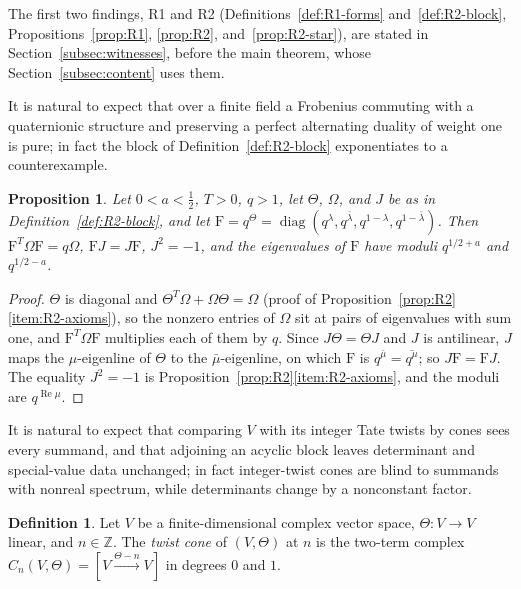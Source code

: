 \documentclass[11pt]{amsart}
\theoremstyle{plain}
\newtheorem{proposition}[theorem]{Proposition}
\theoremstyle{definition}
\newtheorem{definition}[theorem]{Definition}
\theoremstyle{remark}
\numberwithin{equation}{section}
\newcommand{\Z}{\mathbb{Z}}
\DeclareMathOperator{\Rea}{Re}
\DeclareMathOperator{\diag}{diag}
\renewcommand{\Re}{\Rea}
\begin{document}
The first two findings, R1 and R2 (Definitions~\ref{def:R1-forms}
and~\ref{def:R2-block}, Propositions~\ref{prop:R1}, \ref{prop:R2},
and~\ref{prop:R2-star}), are stated in Section~\ref{subsec:witnesses},
before the main theorem, whose Section~\ref{subsec:content} uses them.

It is natural to expect that over a finite field a Frobenius commuting
with a quaternionic structure and preserving a perfect alternating
duality of weight one is pure; in fact the block of
Definition~\ref{def:R2-block} exponentiates to a counterexample.

\begin{proposition}\label{prop:R2-frob}
Let $0<a<\tfrac12$, $T>0$, $q>1$, let $\Theta$, $\Omega$, and $J$ be as
in Definition~\ref{def:R2-block}, and let
$\mathrm{F}=q^\Theta=\diag(q^\lambda,q^{\bar\lambda},q^{1-\lambda},
q^{1-\bar\lambda})$. Then $\mathrm{F}^T\Omega\mathrm{F}=q\Omega$,
$\mathrm{F}J=J\mathrm{F}$, $J^2=-1$, and the eigenvalues of
$\mathrm{F}$ have moduli $q^{1/2+a}$ and $q^{1/2-a}$.
\end{proposition}

\begin{proof}
$\Theta$ is diagonal and $\Theta^T\Omega+\Omega\Theta=\Omega$ (proof of
Proposition~\ref{prop:R2}\ref{item:R2-axioms}), so the nonzero entries
of $\Omega$ sit at pairs of eigenvalues with sum one, and
$\mathrm{F}^T\Omega\mathrm{F}$ multiplies each of them by $q$. Since
$J\Theta=\Theta J$ and $J$ is antilinear, $J$ maps the $\mu$-eigenline
of $\Theta$ to the $\bar\mu$-eigenline, on which $\mathrm{F}$ is
$q^{\bar\mu}=\overline{q^\mu}$; so $J\mathrm{F}=\mathrm{F}J$. The
equality $J^2=-1$ is Proposition~\ref{prop:R2}\ref{item:R2-axioms}, and
the moduli are $q^{\Re\mu}$.
\end{proof}

It is natural to expect that comparing $V$ with its integer Tate twists
by cones sees every summand, and that adjoining an acyclic block leaves
determinant and special-value data unchanged; in fact integer-twist
cones are blind to summands with nonreal spectrum, while determinants
change by a nonconstant factor.

\begin{definition}\label{def:twist-cone}
Let $V$ be a finite-dimensional complex vector space, $\Theta:V\to V$
linear, and $n\in\Z$. The \emph{twist cone} of $(V,\Theta)$ at $n$ is the
two-term complex $C_n(V,\Theta)=[V\xrightarrow{\Theta-n}V]$ in degrees
$0$ and $1$.
\end{definition}
\end{document}
